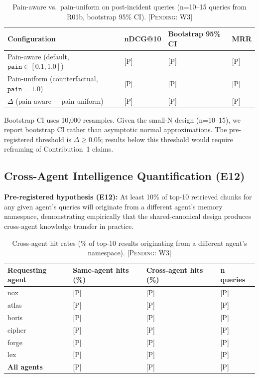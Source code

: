 \documentclass{article}
\begin{document}
\begin{table}[t]
  \caption{Pain-aware vs.\ pain-uniform on post-incident queries
    (n=10--15 queries from R01b, bootstrap 95\% CI). \textsc{[Pending: W3]}}
  \label{tab:pain}
  \centering
  \begin{tabular}{llll}
    \toprule
    Configuration & nDCG@10 & Bootstrap 95\% CI & MRR \\
    \midrule
    Pain-aware (default, $\texttt{pain} \in [0.1, 1.0]$) & {[}P{]} & {[}P{]} & {[}P{]} \\
    Pain-uniform (counterfactual, $\texttt{pain}=1.0$)    & {[}P{]} & {[}P{]} & {[}P{]} \\
    $\Delta$ (pain-aware $-$ pain-uniform)                & {[}P{]} & {[}P{]} & {[}P{]} \\
    \bottomrule
  \end{tabular}
  \begin{minipage}{\linewidth}
    \vspace{4pt}
    \footnotesize
    Bootstrap CI uses 10,000 resamples. Given the small-N design (n=10--15), we report
    bootstrap CI rather than asymptotic normal approximations. The pre-registered threshold
    is $\Delta \geq 0.05$; results below this threshold would require reframing of
    Contribution~1 claims.
  \end{minipage}
\end{table}

\subsection{Cross-Agent Intelligence Quantification (E12)}

\textbf{Pre-registered hypothesis (E12):} At least 10\% of top-10 retrieved chunks for
any given agent's queries will originate from a different agent's memory namespace,
demonstrating empirically that the shared-canonical design produces cross-agent knowledge
transfer in practice.

\begin{table}[t]
  \caption{Cross-agent hit rates
    (\% of top-10 results originating from a different agent's namespace).
    \textsc{[Pending: W3]}}
  \label{tab:crossagent}
  \centering
  \begin{tabular}{llll}
    \toprule
    Requesting agent & Same-agent hits (\%) & Cross-agent hits (\%) & n queries \\
    \midrule
    nox    & {[}P{]} & {[}P{]} & {[}P{]} \\
    atlas  & {[}P{]} & {[}P{]} & {[}P{]} \\
    boris  & {[}P{]} & {[}P{]} & {[}P{]} \\
    cipher & {[}P{]} & {[}P{]} & {[}P{]} \\
    forge  & {[}P{]} & {[}P{]} & {[}P{]} \\
    lex    & {[}P{]} & {[}P{]} & {[}P{]} \\
    \textbf{All agents} & {[}P{]} & {[}P{]} & {[}P{]} \\
    \bottomrule
  \end{tabular}
\end{table}
\end{document}
